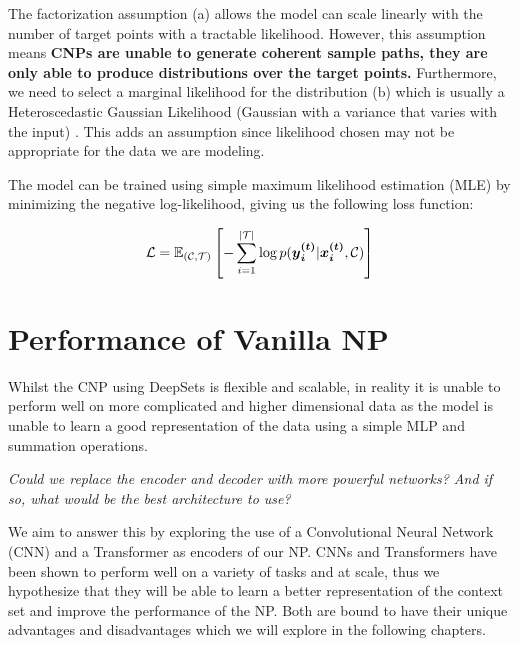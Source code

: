 \documentclass[../../main.tex]{subfiles}
\begin{document}
The  factorization assumption (a) allows the model can scale linearly with the number of target points with a tractable likelihood. However, this assumption means
\textbf{CNPs are unable to generate coherent sample paths, they are only able to produce distributions over the target points.} Furthermore, we need to select a marginal likelihood for the distribution (b) which is usually a Heteroscedastic Gaussian Likelihood (Gaussian with a variance that varies with the input) \parencite{garnelo2018conditional}. This adds an assumption since likelihood chosen may not be appropriate for the data we are modeling.

The model can be trained using simple maximum likelihood estimation (MLE) by minimizing the negative log-likelihood, giving us the following loss function:

\begin{equation}
    \mathcal{L} = \mathbb{E}_{(\mathcal{C}, \mathcal{T})} \left[- \sum_{i=1}^{|\mathcal{T}|} \log p(\bm{{y}_i^{(t)}} | \bm{{x}_i^{(t)}}, \mathcal{C})\right]
\end{equation}




\section{Performance of Vanilla NP}

Whilst the CNP using DeepSets is flexible and scalable, in reality it is unable to perform well on more complicated and higher dimensional data as the model is unable to learn a good representation of the data using a simple MLP and summation operations.

\emph{Could we replace the encoder and decoder with more powerful networks? And if so, what would be the best architecture to use?} 

We aim to answer this by exploring the use of a Convolutional Neural Network (CNN) and a Transformer as encoders of our NP. CNNs and Transformers have been shown to perform well on a variety of tasks and at scale, thus we hypothesize that they will be able to learn a better representation of the context set and improve the performance of the NP.
Both are bound to have their unique advantages and disadvantages which we will explore in the following chapters.



\end{document}
